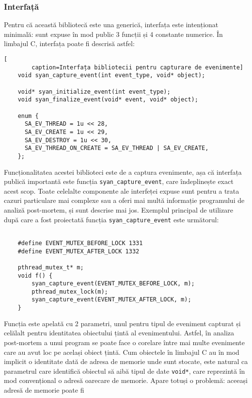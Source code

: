 \subsubsection{Interfață}
Pentru că această bibliotecă este una generică, interfața este
intenționat minimală: sunt expuse în mod public 3 funcții și 4
constante numerice. În limbajul C, interfața poate fi descrisă astfel:
\begin{lstlisting}[
        caption=Interfața bibliotecii pentru capturare de evenimente]
    void syan_capture_event(int event_type, void* object);

    void* syan_initialize_event(int event_type);
    void syan_finalize_event(void* event, void* object);

    enum {
      SA_EV_THREAD = 1u << 28,
      SA_EV_CREATE = 1u << 29,
      SA_EV_DESTROY = 1u << 30,
      SA_EV_THREAD_ON_CREATE = SA_EV_THREAD | SA_EV_CREATE,
    };
\end{lstlisting}
Funcționalitatea acestei biblioteci este de a captura evenimente, așa
că interfața publică importantă este funcția
\lstinline{syan_capture_event}, care îndeplinește exact acest scop.
Toate celelalte componente ale interfeței expuse sunt pentru a trata
cazuri particulare mai complexe sau a oferi mai multă informație
programului de analiză post-mortem, și sunt descrise mai jos. Exemplul
principal de utilizare după care a fost proiectată funcția
\lstinline{syan_capture_event} este următorul:
\begin{lstlisting}[caption=Exemplul folosit în proiectarea interfeței]

    #define EVENT_MUTEX_BEFORE_LOCK 1331
    #define EVENT_MUTEX_AFTER_LOCK 1332

    pthread_mutex_t* m;
    void f() {
        syan_capture_event(EVENT_MUTEX_BEFORE_LOCK, m);
        pthread_mutex_lock(m);
        syan_capture_event(EVENT_MUTEX_AFTER_LOCK, m);
    }
\end{lstlisting}
Funcția este apelată cu 2 parametri, unul pentru tipul de eveniment
capturat și celălalt pentru identitatea obiectului țintă al
evenimentului. Astfel, în analiza post-mortem a unui program se poate
face o corelare între mai multe evenimente care au avut loc pe același
obiect țintă. Cum obiectele în limbajul C au în mod implicit o
identitate dată de adresa de memorie unde sunt stocate, este natural ca
parametrul care identifică obiectul să aibă tipul de date
\lstinline{void*}, care reprezintă în mod convențional o adresă oarecare
de memorie. Apare totuși o problemă: aceeași adresă de memorie poate fi
